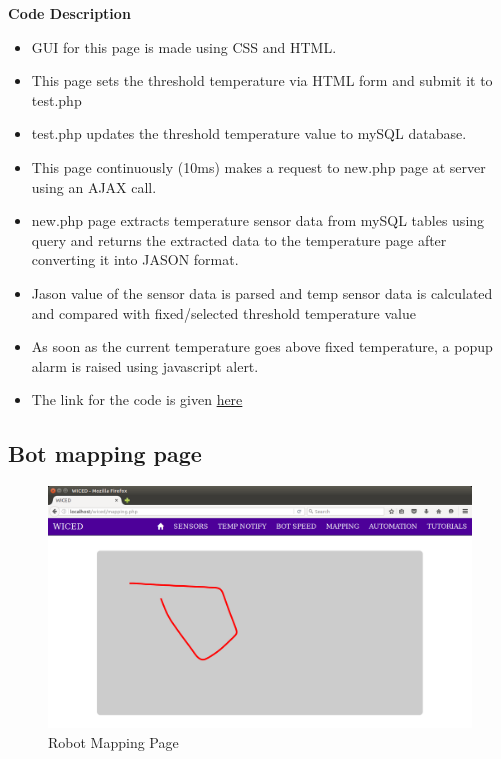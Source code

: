 \documentclass[a4paper,12pt,oneside]{book}
\begin{document}
  \textbf{Code Description}
 \begin{itemize}
        \item GUI for this page is made using CSS and HTML.
        \item This page sets the threshold temperature via HTML form and submit it to test.php
        \item test.php updates the threshold temperature value to mySQL database.
        \item This page continuously (10ms) makes a request to new.php page at server using an AJAX call.
        \item new.php page extracts temperature sensor data from mySQL tables using query and returns the extracted data to the temperature page after converting it into JASON format.
        
        \item Jason value of the sensor data is parsed and temp sensor data is calculated and compared with fixed/selected threshold temperature value
        \item As soon as the current temperature goes above fixed temperature, a popup alarm is raised using javascript alert.
        
        \item The link for the code is given \href{https://github.com/eYSIP-2016/Wiced-Sense/blob/master/Codes/wiced%20web/javascript/temp.js}{here}
        \end{itemize}



























\newpage
\subsection{Bot mapping page}

\begin{figure}[h]
        \centering
    	\includegraphics[scale=0.3]{mapping12.png}
    	\caption{Robot Mapping Page}
	    \end{figure}
	    
\end{document}
